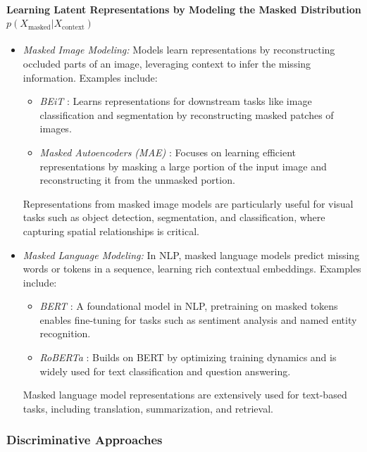 \paragraph{Learning Latent Representations by Modeling the Masked Distribution $p(X_{\text{masked}}|X_{\text{context}})$}

\begin{itemize}
    \item \textit{Masked Image Modeling:}
    Models learn representations by reconstructing occluded parts of an image, leveraging context to infer the missing information. Examples include:
        \begin{itemize}
            \item \emph{BEiT} \citep{bao2021beit}: Learns representations for downstream tasks like image classification and segmentation by reconstructing masked patches of images.
            \item \emph{Masked Autoencoders (MAE)} \citep{he2022masked}: Focuses on learning efficient representations by masking a large portion of the input image and reconstructing it from the unmasked portion.
        \end{itemize}
        
        Representations from masked image models are particularly useful for visual tasks such as object detection, segmentation, and classification, where capturing spatial relationships is critical.
    

    \item \textit{Masked Language Modeling:}
    In NLP, masked language models predict missing words or tokens in a sequence, learning rich contextual embeddings. Examples include:
        \begin{itemize}
            \item \emph{BERT} \citep{devlin2019bert}: A foundational model in NLP, pretraining on masked tokens enables fine-tuning for tasks such as sentiment analysis and named entity recognition.
            \item \emph{RoBERTa} \citep{liu2019roberta}: Builds on BERT by optimizing training dynamics and is widely used for text classification and question answering.
        \end{itemize}
        Masked language model representations are extensively used for text-based tasks, including translation, summarization, and retrieval.
\end{itemize}

\subsubsection{Discriminative Approaches}

